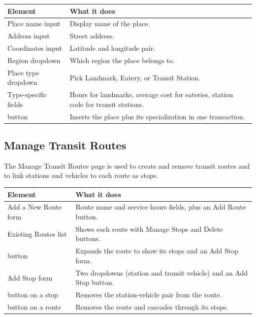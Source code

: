 \documentclass[11pt,letterpaper]{article}
\let\oldtexttt\texttt
\renewcommand{\texttt}[1]{{\color{inlinecode}\oldtexttt{#1}}}
\begin{document}
\begin{table}[H]
    \centering
    \begin{tabularx}{\textwidth}{lX}
        \toprule
        \textbf{Element} & \textbf{What it does} \\
        \midrule
        Place name input & Display name of the place. \\
        Address input & Street address. \\
        Coordinates input & Latitude and longitude pair. \\
        Region dropdown & Which region the place belongs to. \\
        Place type dropdown & Pick Landmark, Eatery, or Transit Station. \\
        Type-specific fields & Hours for landmarks, average cost for eateries, station code for transit stations. \\
        \texttt{Add Place} button & Inserts the place plus its specialization in one transaction. \\
        \bottomrule
    \end{tabularx}
\end{table}

\subsection{Manage Transit Routes}

The Manage Transit Routes page is used to create and remove transit routes and to link stations and vehicles to each route as stops.

\begin{table}[H]
    \centering
    \begin{tabularx}{\textwidth}{lX}
        \toprule
        \textbf{Element} & \textbf{What it does} \\
        \midrule
        Add a New Route form & Route name and service hours fields, plus an Add Route button. \\
        Existing Routes list & Shows each route with Manage Stops and Delete buttons. \\
        \texttt{Manage Stops} button & Expands the route to show its stops and an Add Stop form. \\
        Add Stop form & Two dropdowns (station and transit vehicle) and an Add Stop button. \\
        \texttt{Remove} button on a stop & Removes the station-vehicle pair from the route. \\
        \texttt{Delete} button on a route & Removes the route and cascades through its stops. \\
        \bottomrule
    \end{tabularx}
\end{table}
\end{document}
